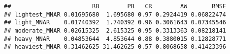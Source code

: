\documentclass[
]{article}
\begin{document}
\begin{verbatim}
##                       RB        PB   CR        AW       RMSE
## lightest_MNAR 0.01695680  1.695680 0.97 0.2924419 0.06822474
## light_MNAR    0.01740392  1.740392 0.96 0.3061643 0.07345546
## moderate_MNAR 0.02615325  2.615325 0.95 0.3313363 0.08218141
## heavy_MNAR    0.04853644  4.853644 0.88 0.3880015 0.12828771
## heaviest_MNAR 0.31462625 31.462625 0.57 0.8068658 0.41423396
\end{verbatim}
\end{document}
